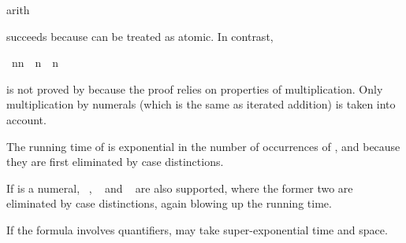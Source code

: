 \begin{isabellebody}
%
\isadelimproof
%
\endisadelimproof
%
\isatagproof
{}\isamarkupfalse%
{\isacharparenleft}arith{\isacharparenright}%
\endisatagproof
{\isafoldproof}%
%
\isadelimproof
%
\endisadelimproof
%
\begin{isamarkuptext}%
\noindent
succeeds because  can be treated as atomic. In contrast,%
\end{isamarkuptext}%
\isamarkuptrue%
\isamarkupfalse%
\ {\isachardoublequoteopen}n{\isacharasterisk}n\ {\isacharequal}\ n{\isacharplus}{}\ {\isasymLongrightarrow}\ n{\isacharequal}{}{\isachardoublequoteclose}%
\isadelimproof
%
\endisadelimproof
%
\isatagproof
%
\endisatagproof
{\isafoldproof}%
%
\isadelimproof
%
\endisadelimproof
%
\begin{isamarkuptext}%
\noindent
is not proved by  because the proof relies 
on properties of multiplication. Only multiplication by numerals (which is
the same as iterated addition) is taken into account.

\begin{warn} The running time of  is exponential in the number
  of occurrences of ,  and
   because they are first eliminated by case distinctions.

If  is a numeral, ~, ~ and
~ are also supported, where the former two are eliminated
by case distinctions, again blowing up the running time.

If the formula involves quantifiers,  may take
super-exponential time and space.
\end{warn}%
\end{isamarkuptext}%
\isamarkuptrue%
%
\isadelimtheory
%
\endisadelimtheory
%
\isatagtheory
%
\endisatagtheory
{\isafoldtheory}%
%
\isadelimtheory
%
\endisadelimtheory
\end{isabellebody}%
